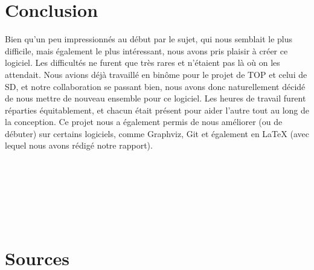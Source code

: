 \documentclass[12pt,a4paper]{report}
\begin{document}
\section{Conclusion}
Bien qu'un peu impressionnés au début par le sujet, qui nous semblait le plus difficile, mais également le plus intéressant, nous avons pris plaisir à créer ce logiciel. Les difficultés ne furent que très rares et n'étaient pas là où on les attendait. Nous avions déjà travaillé en binôme pour le projet de TOP et celui de SD, et notre collaboration se passant bien, nous avons donc naturellement décidé de nous mettre de nouveau ensemble pour ce logiciel. Les heures de travail furent réparties équitablement, et chacun était présent pour aider l'autre tout au long de la conception. Ce projet nous a également permis de nous améliorer (ou de débuter) sur certains logiciels, comme Graphviz, Git et également en LaTeX (avec lequel nous avons rédigé notre rapport).
\\
\\
\\
\\
\\
\\
\\
\pagebreak

\section{Sources}
\end{document}

